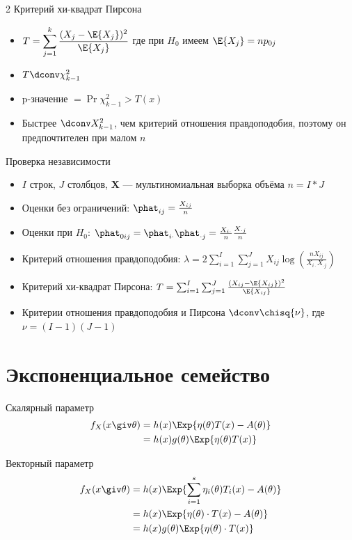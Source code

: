 \documentclass[landscape]{article}
\begin{document}
\begin{multicols*}{2}
Критерий хи-квадрат Пирсона
\begin{itemize}
  \item $T = \displaystyle \sum_{j=1}^k \frac{(X_j-\E{X_j})^2}{\E{X_j}}$
    где при $H_0$ имеем $\E{X_j} = np_{0j}$
  \item $T \dconv \chi_{k-1}^2$
  \item p-значение $= \Pr{\chi_{k-1}^2 > T(x)}$
  \item Быстрее $\dconv X_{k-1}^2$, чем критерий отношения правдоподобия,
    поэтому он предпочтителен при малом $n$
\end{itemize}

Проверка независимости
\begin{itemize}
  \item $I$ строк, $J$ столбцов,
    $\mathbf{X}$ — мультиномиальная выборка объёма $n=I*J$
  \item Оценки \mle без ограничений: $\phat_{ij} = \frac{X_{ij}}{n}$
  \item Оценки \mle при $H_0$:
    $\phat_{0ij} = \phat_{i\cdot}\phat_{\cdot j}
    = \frac{X_{i\cdot}}{n} \frac{X_{\cdot j}}{n}$
  \item Критерий отношения правдоподобия: $\lambda = 2\sum_{i=1}^I\sum_{j=1}^J X_{ij}
    \log\left( \frac{nX_{ij}}{X_{i\cdot}X_{\cdot j}}\right)$
  \item Критерий хи-квадрат Пирсона: $T = \sum_{i=1}^I\sum_{j=1}^J
    \frac{(X_{ij}-\E{X_{ij}})^2}{\E{X_{ij}}}$
  \item Критерии отношения правдоподобия и Пирсона $\dconv \chisq{\nu}$,
    где $\nu=(I-1)(J-1)$
\end{itemize}

\section{Экспоненциальное семейство}

Скалярный параметр
\begin{align*}
f_X(x \giv \theta)
&= h(x) \Exp{\eta(\theta)T(x) - A(\theta)} \\
&= h(x) g(\theta) \Exp{\eta(\theta)T(x)}
\end{align*}

Векторный параметр
\begin{align*}
f_X(x \giv \theta)
&= h(x) \Exp{\sum_{i=1}^s\eta_i(\theta)T_i(x) - A(\theta)} \\
&= h(x) \Exp{\eta(\theta)\cdot T(x) - A(\theta)} \\
&= h(x) g(\theta)\Exp{\eta(\theta)\cdot T(x)}
\end{align*}


\end{multicols*}
\end{document}
